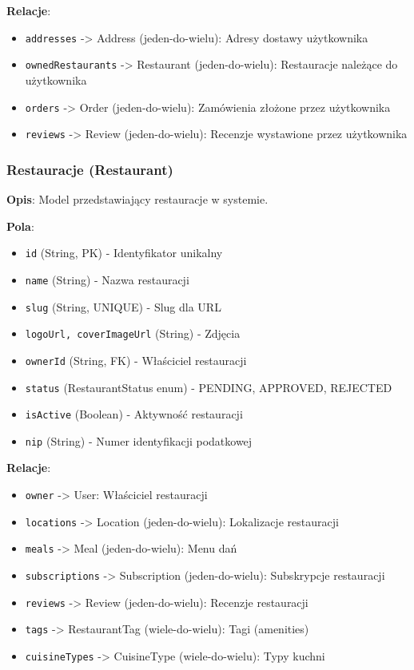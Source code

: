\documentclass[12pt,a4paper,utf-8]{article}
\begin{document}
\textbf{Relacje}:
\begin{itemize}
    \item \texttt{addresses} -> Address (jeden-do-wielu): Adresy dostawy użytkownika
    \item \texttt{ownedRestaurants} -> Restaurant (jeden-do-wielu): Restauracje należące do użytkownika
    \item \texttt{orders} -> Order (jeden-do-wielu): Zamówienia złożone przez użytkownika
    \item \texttt{reviews} -> Review (jeden-do-wielu): Recenzje wystawione przez użytkownika
\end{itemize}

\subsubsection{Restauracje (Restaurant)}

\textbf{Opis}: Model przedstawiający restauracje w systemie.

\textbf{Pola}:
\begin{itemize}
    \item \texttt{id} (String, PK) - Identyfikator unikalny
    \item \texttt{name} (String) - Nazwa restauracji
    \item \texttt{slug} (String, UNIQUE) - Slug dla URL
    \item \texttt{logoUrl, coverImageUrl} (String) - Zdjęcia
    \item \texttt{ownerId} (String, FK) - Właściciel restauracji
    \item \texttt{status} (RestaurantStatus enum) - PENDING, APPROVED, REJECTED
    \item \texttt{isActive} (Boolean) - Aktywność restauracji
    \item \texttt{nip} (String) - Numer identyfikacji podatkowej
\end{itemize}

\textbf{Relacje}:
\begin{itemize}
    \item \texttt{owner} -> User: Właściciel restauracji
    \item \texttt{locations} -> Location (jeden-do-wielu): Lokalizacje restauracji
    \item \texttt{meals} -> Meal (jeden-do-wielu): Menu dań
    \item \texttt{subscriptions} -> Subscription (jeden-do-wielu): Subskrypcje restauracji
    \item \texttt{reviews} -> Review (jeden-do-wielu): Recenzje restauracji
    \item \texttt{tags} -> RestaurantTag (wiele-do-wielu): Tagi (amenities)
    \item \texttt{cuisineTypes} -> CuisineType (wiele-do-wielu): Typy kuchni
\end{itemize}
\end{document}
